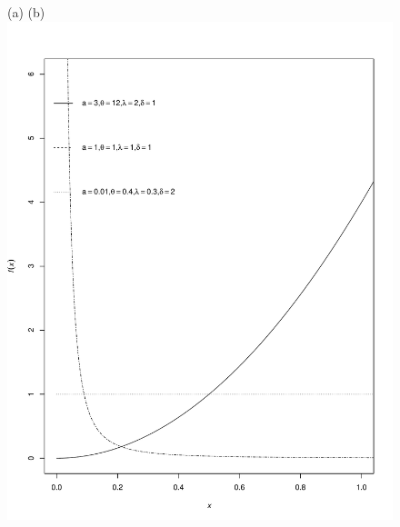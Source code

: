 \documentclass[12pt,a4paper]{article} %
\begin{document}
\begin{figure}[h!]
\begin{center}
(a)\hspace{3.5cm} (b)\\
\includegraphics[scale=.3]{density.pdf}

\end{center}
\end{figure}
\end{document}
